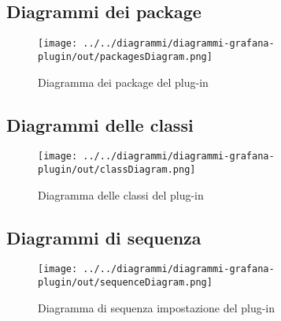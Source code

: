 \documentclass[../specifica-tecnica.tex]{subfiles}
\begin{document}
\subsection{Diagrammi dei package}
\begin{figure}[H]
  \begin{center}
    \texttt{[image: ../../diagrammi/diagrammi-grafana-plugin/out/packagesDiagram.png]}\\
    \caption{Diagramma dei package del plug-in}%
  \end{center}
\end{figure}

\newpage

\subsection{Diagrammi delle classi}
\begin{figure}[H]
  \begin{center}
    \texttt{[image: ../../diagrammi/diagrammi-grafana-plugin/out/classDiagram.png]}\\
    \caption{Diagramma delle classi del plug-in}%
  \end{center}
\end{figure}

\newpage

\subsection{Diagrammi di sequenza}
\begin{figure}[H]
  \begin{center}
    \texttt{[image: ../../diagrammi/diagrammi-grafana-plugin/out/sequenceDiagram.png]}\\
    \caption{Diagramma di sequenza impostazione del plug-in}%
  \end{center}
\end{figure}
\end{document}
